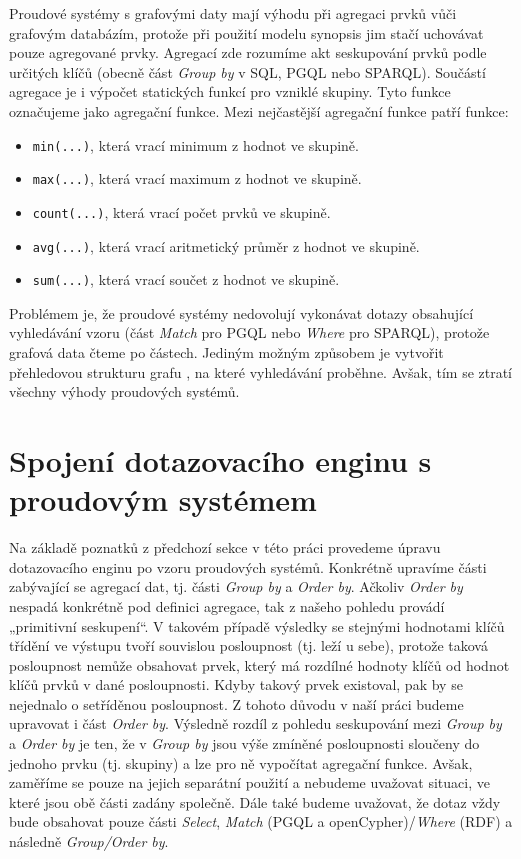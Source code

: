 Proudové systémy s grafovými daty mají výhodu při agregaci prvků vůči grafovým databázím, protože při použití modelu synopsis jim stačí uchovávat pouze agregované prvky. 
Agregací zde rozumíme akt seskupování prvků podle určitých klíčů (obecně část \textit{Group by} v SQL, PGQL nebo SPARQL).
Součástí agregace je i výpočet statických funkcí pro vzniklé skupiny.
Tyto funkce označujeme jako agregační funkce.
Mezi nejčastější agregační funkce patří funkce:
\begin{itemize} 
\item \texttt{min(...)}, která vrací minimum z hodnot ve skupině.
\item \texttt{max(...)}, která vrací maximum z hodnot ve skupině.
\item \texttt{count(...)}, která vrací počet prvků ve skupině.
\item \texttt{avg(...)}, která vrací aritmetický průměr z hodnot ve skupině.
\item \texttt{sum(...)}, která vrací součet z hodnot ve skupině.
\end{itemize}
Problémem je, že proudové systémy nedovolují vykonávat dotazy obsahující vyhledávání vzoru (část \textit{Match} pro PGQL nebo \textit{Where} pro SPARQL), protože grafová data čteme po částech.
Jediným možným způsobem je vytvořit přehledovou strukturu grafu \citep{graphsummary}, na které vyhledávání proběhne.
Avšak, tím se ztratí všechny výhody proudových systémů.

\section*{Spojení dotazovacího enginu s proudovým systémem}

Na základě poznatků z předchozí sekce v této práci provedeme úpravu dotazovacího enginu po vzoru proudových systémů.
Konkrétně upravíme části zabývající se agregací dat, tj. části \textit{Group by} a \textit{Order by}.
Ačkoliv \textit{Order by} nespadá konkrétně pod definici agregace, tak z našeho pohledu provádí „primitivní seskupení“.
V takovém případě výsledky se stejnými hodnotami klíčů třídění ve výstupu tvoří souvislou posloupnost (tj. leží u sebe), protože taková posloupnost nemůže obsahovat prvek, který má rozdílné hodnoty klíčů od hodnot klíčů prvků v dané posloupnosti.
Kdyby takový prvek existoval, pak by se nejednalo o setříděnou posloupnost.   
Z tohoto důvodu v naší práci budeme upravovat i část \textit{Order by}.
Výsledně rozdíl z pohledu seskupování mezi \textit{Group by} a \textit{Order by} je ten, že v \textit{Group by} jsou výše zmíněné posloupnosti sloučeny do jednoho prvku (tj. skupiny) a lze pro ně vypočítat agregační funkce. 
Avšak, zaměříme se pouze na jejich separátní použití a nebudeme uvažovat situaci, ve které jsou obě části zadány společně.
Dále také budeme uvažovat, že dotaz vždy bude obsahovat pouze části \textit{Select}, \textit{Match} (PGQL a openCypher)/\textit{Where} (RDF) a následně \textit{Group/Order by}.

